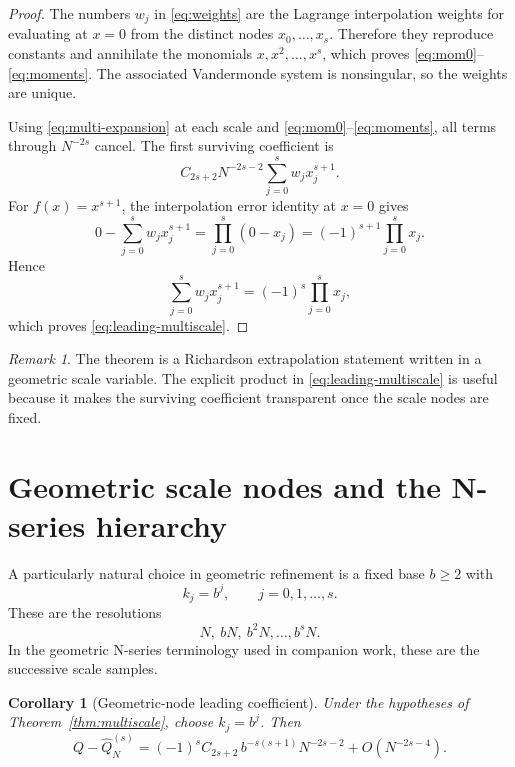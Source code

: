 \documentclass[11pt]{article}
\newtheorem{corollary}[theorem]{Corollary}
\theoremstyle{remark}
\newtheorem{remark}[theorem]{Remark}
\newcommand{\wideQ}{\widehat{Q}}
\begin{document}
\begin{proof}
The numbers $w_j$ in \eqref{eq:weights} are the Lagrange interpolation
weights for evaluating at $x=0$ from the distinct nodes
$x_0,\ldots,x_s$.  Therefore they reproduce constants and annihilate the
monomials $x,x^2,\ldots,x^s$, which proves
\eqref{eq:mom0}--\eqref{eq:moments}.  The associated Vandermonde system is
nonsingular, so the weights are unique.

Using \eqref{eq:multi-expansion} at each scale and
\eqref{eq:mom0}--\eqref{eq:moments}, all terms through $N^{-2s}$ cancel.
The first surviving coefficient is
\[
C_{2s+2}N^{-2s-2}
\sum_{j=0}^{s}w_jx_j^{s+1}.
\]
For $f(x)=x^{s+1}$, the interpolation error identity at $x=0$ gives
\[
0-\sum_{j=0}^{s}w_jx_j^{s+1}
=
\prod_{j=0}^{s}(0-x_j)
=
(-1)^{s+1}\prod_{j=0}^{s}x_j.
\]
Hence
\[
\sum_{j=0}^{s}w_jx_j^{s+1}
=
(-1)^s\prod_{j=0}^{s}x_j,
\]
which proves \eqref{eq:leading-multiscale}.
\end{proof}

\begin{remark}
The theorem is a Richardson extrapolation statement written in a geometric
scale variable.  The explicit product in \eqref{eq:leading-multiscale} is
useful because it makes the surviving coefficient transparent once the scale
nodes are fixed.
\end{remark}

\section{Geometric scale nodes and the N-series hierarchy}

A particularly natural choice in geometric refinement is a fixed base
$b\ge2$ with
\begin{equation}
\label{eq:geometric-nodes}
k_j=b^j,
\qquad
j=0,1,\ldots,s.
\end{equation}
These are the resolutions
\[
N,\ bN,\ b^2N,\ldots,b^sN.
\]
In the geometric N-series terminology used in companion work, these are the
successive scale samples.

\begin{corollary}[Geometric-node leading coefficient]
\label{cor:geometric-nodes}
Under the hypotheses of Theorem~\ref{thm:multiscale}, choose
$k_j=b^j$.  Then
\begin{equation}
\label{eq:geometric-leading}
Q-\wideQ_N^{(s)}
=
(-1)^s C_{2s+2}\,b^{-s(s+1)}N^{-2s-2}
+O(N^{-2s-4}).
\end{equation}
\end{corollary}
\end{document}
